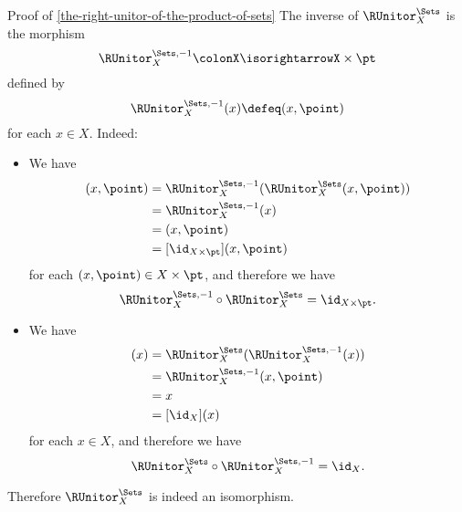 \begin{Proof}{Proof of \cref{the-right-unitor-of-the-product-of-sets}}%
    The inverse of $\RUnitor^{\Sets}_{X}$ is the morphism
    \[
        \RUnitor^{\Sets,-1}_{X}%
        \colon%
        X%
        \isorightarrow%
        X\times\pt%
    \]%
    defined by
    \[
        \RUnitor^{\Sets,-1}_{X}(x)%
        \defeq%
        (x,\point)
    \]%
    for each $x\in X$. Indeed:
    \begin{itemize}
        \item{}We have
            \begin{align*}
                [\RUnitor^{\Sets,-1}_{X}\circ\RUnitor^{\Sets}_{X}](x,\point) &= \RUnitor^{\Sets,-1}_{X}(\RUnitor^{\Sets}_{X}(x,\point))\\
                                                                             &= \RUnitor^{\Sets,-1}_{X}(x)\\
                                                                             &= (x,\point)\\
                                                                             &= [\id_{X\times\pt}](x,\point)
            \end{align*}
            for each $(x,\point)\in X\times\pt$, and therefore we have
            \[
                \RUnitor^{\Sets,-1}_{X}%
                \circ%
                \RUnitor^{\Sets}_{X}%
                =%
                \id_{X\times\pt}.%
            \]%
        \item{}We have
            \begin{align*}
                [\RUnitor^{\Sets}_{X}\circ\RUnitor^{\Sets,-1}_{X}](x) &= \RUnitor^{\Sets}_{X}(\RUnitor^{\Sets,-1}_{X}(x))\\
                                                                      &= \RUnitor^{\Sets,-1}_{X}(x,\point)\\
                                                                      &= x\\
                                                                      &= [\id_{X}](x)
            \end{align*}
            for each $x\in X$, and therefore we have
            \[
                \RUnitor^{\Sets}_{X}%
                \circ%
                \RUnitor^{\Sets,-1}_{X}%
                =%
                \id_{X}.%
            \]%
    \end{itemize}
    Therefore $\RUnitor^{\Sets}_{X}$ is indeed an isomorphism.


\end{Proof}
